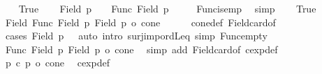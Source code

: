 \begin{isabellebody}
\ \ \isamarkupfalse%
\ True\isanewline
\ \ \isamarkupfalse%
\ {\isachardoublequoteopen}Field\ p{}\ {\isasymnoteq}\ {\isacharbraceleft}{\kern0pt}{\isacharbraceright}{\kern0pt}\ {\isasymLongrightarrow}\ Func\ {\isacharparenleft}{\kern0pt}Field\ p{}{\isacharparenright}{\kern0pt}\ {\isacharbraceleft}{\kern0pt}{\isacharbraceright}{\kern0pt}\ {\isacharequal}{\kern0pt}\ {\isacharbraceleft}{\kern0pt}{\isacharbraceright}{\kern0pt}{\isachardoublequoteclose}\ \isamarkupfalse%
\ Func{\isacharunderscore}{\kern0pt}is{\isacharunderscore}{\kern0pt}emp\ \isamarkupfalse%
\ simp\isanewline
\ \ \isamarkupfalse%
\ True\ \isamarkupfalse%
\ {\isachardoublequoteopen}{\isacharbar}{\kern0pt}Field\ {\isacharbar}{\kern0pt}Func\ {\isacharparenleft}{\kern0pt}Field\ p{}{\isacharparenright}{\kern0pt}\ {\isacharparenleft}{\kern0pt}Field\ p{}{\isacharparenright}{\kern0pt}{\isacharbar}{\kern0pt}{\isacharbar}{\kern0pt}\ {\isasymle}o\ cone{\isachardoublequoteclose}\isanewline
\ \ \ \ \isamarkupfalse%
\ cone{\isacharunderscore}{\kern0pt}def\ Field{\isacharunderscore}{\kern0pt}card{\isacharunderscore}{\kern0pt}of\isanewline
\ \ \ \ \isamarkupfalse%
\ {\isacharparenleft}{\kern0pt}cases\ {\isachardoublequoteopen}Field\ p{}\ {\isacharequal}{\kern0pt}\ {\isacharbraceleft}{\kern0pt}{\isacharbraceright}{\kern0pt}{\isachardoublequoteclose}{\isacharcomma}{\kern0pt}\ auto\ intro{\isacharcolon}{\kern0pt}\ surj{\isacharunderscore}{\kern0pt}imp{\isacharunderscore}{\kern0pt}ordLeq\ simp{\isacharcolon}{\kern0pt}\ Func{\isacharunderscore}{\kern0pt}empty{\isacharparenright}{\kern0pt}\isanewline
\ \ \isamarkupfalse%
\ {\isachardoublequoteopen}{\isacharbar}{\kern0pt}Func\ {\isacharparenleft}{\kern0pt}Field\ p{}{\isacharparenright}{\kern0pt}\ {\isacharparenleft}{\kern0pt}Field\ p{}{\isacharparenright}{\kern0pt}{\isacharbar}{\kern0pt}\ {\isasymle}o\ cone{\isachardoublequoteclose}\ \isamarkupfalse%
\ {\isacharparenleft}{\kern0pt}simp\ add{\isacharcolon}{\kern0pt}\ Field{\isacharunderscore}{\kern0pt}card{\isacharunderscore}{\kern0pt}of\ cexp{\isacharunderscore}{\kern0pt}def{\isacharparenright}{\kern0pt}\isanewline
\ \ \isamarkupfalse%
\ {\isachardoublequoteopen}p{}\ {\isacharcircum}{\kern0pt}c\ p{}\ {\isasymle}o\ cone{\isachardoublequoteclose}\ \isamarkupfalse%
\ cexp{\isacharunderscore}{\kern0pt}def\ \isacommand{{\isachardot}{\kern0pt}}\isamarkupfalse%

\end{isabellebody}
